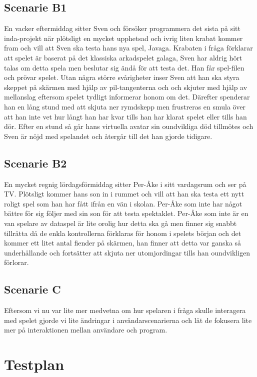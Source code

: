\documentclass[a4paper,11pt]{article}
\begin{document}
\subsection{Scenarie B1}
En vacker eftermiddag sitter Sven och försöker programmera det sista på sitt inda-projekt när plötsligt en mycket upphetsad och ivrig liten krabat kommer fram och vill att Sven ska testa hans nya spel, Javaga. Krabaten i fråga förklarar att spelet är baserat på det klassiska arkadspelet galaga, Sven har aldrig hört talas om detta spela men beslutar sig ändå för att testa det. Han får spel-filen och prövar spelet. Utan några större svårigheter inser Sven att han ska styra skeppet på skärmen med hjälp av pil-tangenterna och och skjuter med hjälp av mellanslag eftersom spelet tydligt informerar honom om det. Därefter spenderar han en lång stund med att skjuta ner rymdskepp men frustreras en smula över att han inte vet hur långt han har kvar tills han har klarat spelet eller tills han dör. Efter en stund så går hans virtuella avatar sin oundvikliga död tillmötes och Sven är nöjd med spelandet och återgår till det han gjorde tidigare.

\subsection{Scenarie B2}
En mycket regnig lördagsförmiddag sitter Per-Åke i sitt vardagsrum och ser på TV. Plötsligt kommer hans son in i rummet och vill att han ska testa ett nytt roligt spel som han har fått ifrån en vän i skolan. Per-Åke som inte har något bättre för sig följer med sin son för att testa spektaklet. Per-Åke som inte är en van spelare av dataspel är lite orolig hur detta ska gå men finner sig snabbt tillrätta då de enkla kontrollerna förklaras för honom i spelets början och det kommer ett litet antal fiender på skärmen, han finner att detta var ganska så underhållande och fortsätter att skjuta ner utomjordingar tills han oundvikligen förlorar.

\subsection{Scenarie C}
Eftersom vi nu var lite mer medvetna om hur spelaren i fråga skulle interagera med spelet gjorde vi lite ändringar i användarscenarierna och lät de fokusera lite mer på interaktionen mellan användare och program.

\section{Testplan}
\end{document}
